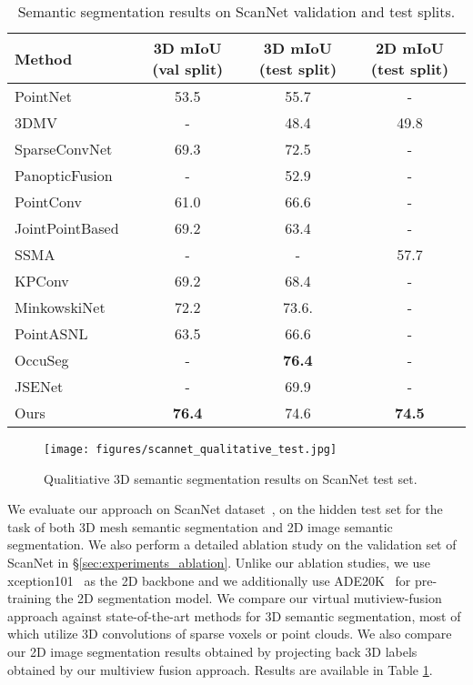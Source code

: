 \documentclass[runningheads]{llncs}
\newcommand{\grayrowcolor}{\rowcolor[gray]{0.85}}
\newcommand{\Sec}[1]{\S\ref{#1}}
\begin{document}
\begin{table}
\centering
\begin{tabular}{|l|c|c|c|}
\hline
\grayrowcolor Method& 3D mIoU (val split) & 3D mIoU (test split) & 2D mIoU (test split)  \\ \hline \hline
PointNet~\cite{qi2017pointnet}              & 53.5   &55.7    &-\\
3DMV~\cite{dai20183dmv}                     & -      &48.4    &49.8\\
SparseConvNet~\cite{graham20183d}           & 69.3   &72.5    &-\\
PanopticFusion~\cite{narita2019panopticfusion} & -      &52.9    &-\\
PointConv~\cite{wu2019pointconv}            & 61.0   &66.6    &-\\
JointPointBased~\cite{jointpointbased}      & 69.2   &63.4    &-\\
SSMA~\cite{valada2019self}                  & -      &-       &57.7\\
KPConv~\cite{thomas2019kpconv}              & 69.2   &68.4    &-\\
MinkowskiNet~\cite{choy20194d}              & 72.2   &73.6.   &-\\
PointASNL~\cite{yan2020pointasnl}           & 63.5   &66.6    &-\\
OccuSeg~\cite{han2020occuseg}               & -   &\textbf{76.4}    &-\\
JSENet~\cite{jsenet}                        & -      &69.9    &-\\
\hline
Ours                                        & \textbf{76.4}   &74.6 &\textbf{74.5}\\
\hline
\end{tabular}
\vspace{2mm}
\caption{Semantic segmentation results on ScanNet validation and test splits.}
\label{tab:scannet_table}
\end{table}




\begin{figure}[tb]
\texttt{[image: figures/scannet\_qualitative\_test.jpg]}
\caption{Qualitiative 3D semantic segmentation results on ScanNet test set.}
\label{fig:qualitative_scannet}
\end{figure}

We evaluate our approach on ScanNet dataset~\cite{dai2017scannet}, on the hidden test set for the task of both 3D mesh semantic segmentation and 2D image semantic segmentation. We also perform a detailed ablation study on the validation set of ScanNet in \Sec{sec:experiments_ablation}. Unlike our ablation studies, we use xception101~\cite{chollet2017xception} as the 2D backbone and we additionally use ADE20K~\cite{zhou2017scene} for pre-training the 2D segmentation model.  We compare our virtual mutiview-fusion approach against state-of-the-art methods for 3D semantic segmentation, most of which utilize 3D convolutions of sparse voxels or point clouds. We also compare our 2D image segmentation results obtained by projecting back 3D labels obtained by our multiview fusion approach. Results are available in Table \ref{tab:scannet_table}.
\end{document}
